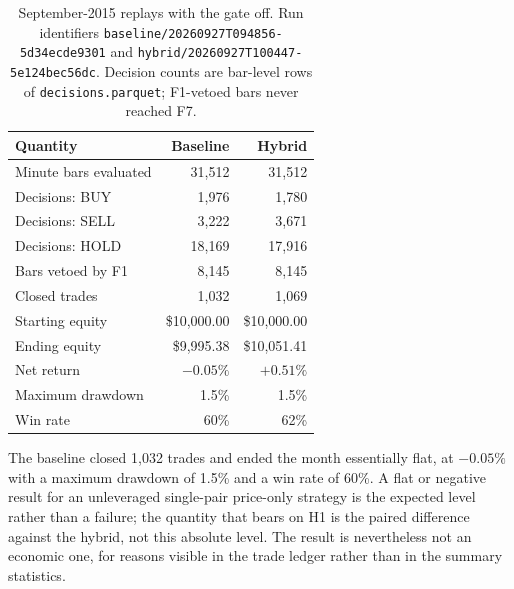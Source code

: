 \begin{table}[htbp]
\centering
\caption[September-2015 replays with the gate off]{September-2015 replays with the gate off. Run identifiers \texttt{baseline/20260927T094856-5d34ecde9301} and \texttt{hybrid/20260927T100447-5e124bec56dc}. Decision counts are bar-level rows of \texttt{decisions.parquet}; F1-vetoed bars never reached F7.}
\label{tab:september-replay}
\small
\begin{tabular}{p{5.2cm}rr}
\toprule
\textbf{Quantity} & \textbf{Baseline} & \textbf{Hybrid} \\
\midrule
Minute bars evaluated & 31,512 & 31,512 \\
Decisions: BUY & 1,976 & 1,780 \\
Decisions: SELL & 3,222 & 3,671 \\
Decisions: HOLD & 18,169 & 17,916 \\
Bars vetoed by F1 & 8,145 & 8,145 \\
Closed trades & 1,032 & 1,069 \\
Starting equity & \$10,000.00 & \$10,000.00 \\
Ending equity & \$9,995.38 & \$10,051.41 \\
Net return & $-0.05\%$ & $+0.51\%$ \\
Maximum drawdown & 1.5\% & 1.5\% \\
Win rate & 60\% & 62\% \\
\bottomrule
\end{tabular}
\end{table}

The baseline closed 1,032 trades and ended the month essentially flat, at $-0.05\%$ with a maximum drawdown of 1.5\% and a win rate of 60\%. A flat or negative result for an unleveraged single-pair price-only strategy is the expected level rather than a failure; the quantity that bears on H1 is the paired difference against the hybrid, not this absolute level. The result is nevertheless not an economic one, for reasons visible in the trade ledger rather than in the summary statistics.

